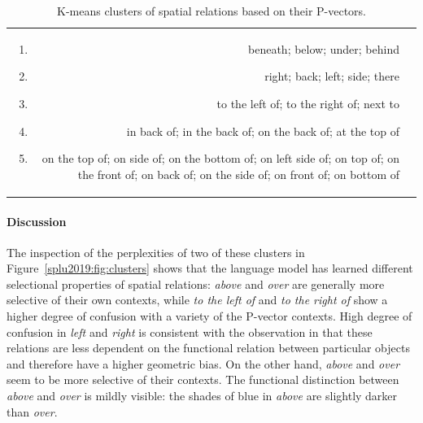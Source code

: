 \begin{table}
\begin{tabular}{r|l}
\begin{minipage}[b]{0.65\linewidth}
\begin{footnotesize}
\begin{enumerate}[noitemsep,topsep=0pt,parsep=0pt,partopsep=0pt]
            \item \label{item:under} beneath; below; under; behind
            \item  \label{item:leftof} right; back; left; side; there
            \item  to the left of; to the right of; next to
            \item  in back of; in the back of; on the back of; at the top of
            \item \label{item:topof} on the top of; on side of; on the bottom of; on left side of; on top of; on the front of; on back of; on the side of; on front of; on bottom of
          \end{enumerate}
        \end{footnotesize}
        \end{minipage}\tabularnewline
    \end{tabular}
	\vspace{0.5em}
    \caption{K-means clusters of spatial relations based on their P-vectors.} %
    \label{splu2019:tab:clusters}
\end{table}

\paragraph{Discussion}  The inspection of the perplexities of two of these
clusters in Figure~\ref{splu2019:fig:clusters} shows that the language model has learned
different selectional properties of spatial relations:
\emph{above} and \emph{over} are generally more selective of their own
contexts, while \emph{to the left of} and \emph{to the right of} show a
higher degree of confusion with a variety of the P-vector contexts.
High degree of confusion in \emph{left} and \emph{right} is consistent with the
observation in \cite{Dobnik:2013aa} that these relations are less dependent on the functional
relation between particular objects and therefore have a higher geometric bias.
On the other hand, \emph{above} and \emph{over} seem to be more selective of
their contexts. The functional distinction between \emph{above} and \emph{over}
is mildly visible: the shades of blue in
\emph{above} are slightly darker than \emph{over}.

